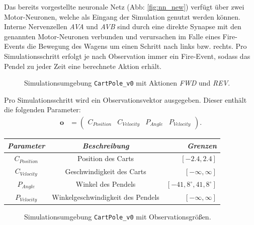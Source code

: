 	Das bereits vorgestellte neuronale Netz (Abb: \ref{fig:nn_new}) verfügt über zwei Motor-Neuronen, welche als Eingang der Simulation genutzt werden können. Interne Nervenzellen \textit{AVA} und \textit{AVB} sind durch eine direkte Synapse mit den genannten Motor-Neuronen verbunden und verursachen im Falle eines Fire-Events die Bewegung des Wagens um einen Schritt nach links bzw. rechts. Pro Simulationsschritt erfolgt je nach Observation immer ein Fire-Event, sodass das Pendel zu jeder Zeit eine berechnete Aktion erhält.
	\begin{figure}[H] %
		\centering
		\def\svgwidth{12cm}
		
		\caption{Simulationsumgebung \texttt{CartPole\_v0} mit Aktionen \textit{FWD} und \textit{REV}.}
		\label{fig:imp_cartpole_FWD_REV}
	\end{figure}
	Pro Simulationsschritt wird ein Observationsvektor ausgegeben. Dieser enthält die folgenden Parameter:
	\begin{align}
		\boldsymbol{o} &= \begin{pmatrix}C_{Position} & C_{Velocity} & P_{Angle} & P_{Velocity}\end{pmatrix}\text{.}
	\end{align}
	\begin{center}
		\begin{tabular}{c@{\hskip 0.5cm}c@{\hskip 0.5cm}r@{\hskip 0.5cm}}    \toprule
			\setlength{\tabcolsep}{50pt}
			\renewcommand{\arraystretch}{1.5}
			\emph{Parameter}	& \emph{Beschreibung}  				& \emph{Grenzen} 			\\\midrule
			$C_{Position}$		& Position des Carts				& $[-2.4, 2.4]$				\\
			$C_{Velocity}$		& Geschwindigkeit des Carts			& $[-\infty, \infty]$		\\
			$P_{Angle}$			& Winkel des Pendels				& $[-41,8^{\circ}, 41,8^{\circ}]$	\\
			$P_{Velocity}$		& Winkelgeschwindigkeit des Pendels	& $[-\infty, \infty]$		\\\bottomrule
			\hline
		\end{tabular}
	\end{center}
	\begin{figure}[!h] %
		\centering
		\def\svgwidth{12cm}
		
		\caption{Simulationsumgebung \texttt{CartPole\_v0} mit Observationsgrößen.}
		\label{fig:imp_cartpole_observation}
	\end{figure}
